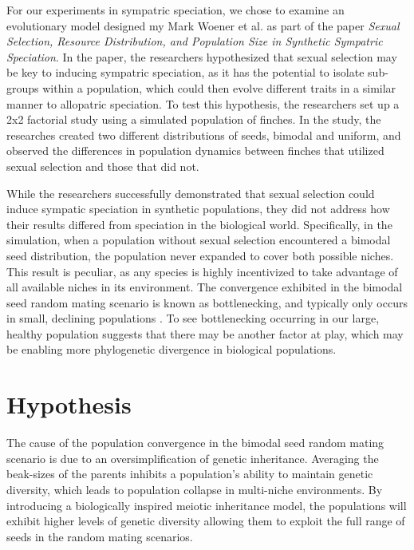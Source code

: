 \documentclass{article}
\begin{document}
For our experiments in sympatric speciation, we chose to examine an evolutionary model designed my Mark Woener et al. as part of the paper \textit{Sexual Selection, Resource Distribution, and Population Size in Synthetic Sympatric Speciation}. In the paper, the researchers hypothesized that sexual selection may be key to inducing sympatric speciation, as it has the potential to isolate sub-groups within a population, which could then evolve different traits in a similar manner to allopatric speciation. To test this hypothesis, the researchers set up a 2x2 factorial study using a simulated population of finches. In the study, the researches created two different distributions of seeds, bimodal and uniform, and observed the differences in population dynamics between finches that utilized sexual selection and those that did not.

While the researchers successfully demonstrated that sexual selection could induce sympatic speciation in synthetic populations, they did not address how their results differed from speciation in the biological world. Specifically, in the simulation, when a population without sexual selection encountered a bimodal seed distribution, the population never expanded to cover both possible niches. This result is peculiar, as any species is highly incentivized to take advantage of all available niches in its environment. The convergence exhibited in the bimodal seed random mating scenario is known as bottlenecking, and typically only occurs in small, declining populations \cite{CHICKEN}. To see bottlenecking occurring in our large, healthy population suggests that there may be another factor at play, which may be enabling more phylogenetic divergence in biological populations.



\section{Hypothesis}

The cause of the population convergence in the bimodal seed random mating scenario is due to an oversimplification of genetic inheritance. Averaging the beak-sizes of the parents inhibits a population’s ability to maintain genetic diversity, which leads to population collapse in multi-niche environments. By introducing a biologically inspired meiotic inheritance model, the populations will exhibit higher levels of genetic diversity allowing them to exploit the full range of seeds in the random mating scenarios. 
\end{document}
